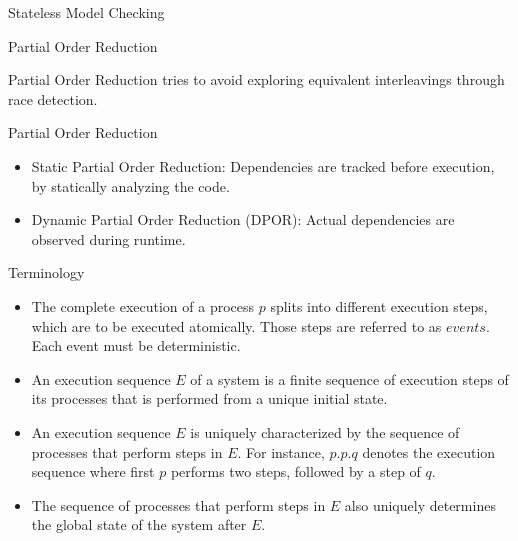 \begin{frame} {Stateless Model Checking}



\end{frame}

\begin{frame} {Partial Order Reduction}

Partial Order Reduction tries to avoid exploring equivalent interleavings through race detection.


\end{frame}

\begin{frame} {Partial Order Reduction}
\begin{itemize}[<+->]
    \item Static Partial Order Reduction: Dependencies are tracked before execution, by statically analyzing the code.
    \item Dynamic Partial Order Reduction (DPOR): Actual dependencies are observed during runtime.
\end{itemize}

\end{frame}


\begin{frame} {Terminology}

\begin{itemize}[<+->]
    \item The complete execution of a process $p$ splits into different execution steps, which are
    to be executed atomically. Those steps are referred to as $events$. Each event must be deterministic.
    \item An execution sequence $E$ of a system is a finite sequence of execution steps
    of its processes that is performed from a unique initial state.
    \item An execution sequence $E$ is uniquely characterized by the sequence of processes
    that perform steps in $E$. For instance, $p.p.q$ denotes the execution
    sequence where first $p$ performs two steps, followed by a step of $q$.
    \item The sequence of processes that perform steps in $E$ also uniquely
    determines the global state of the system after $E$.
\end{itemize}

\end{frame}


